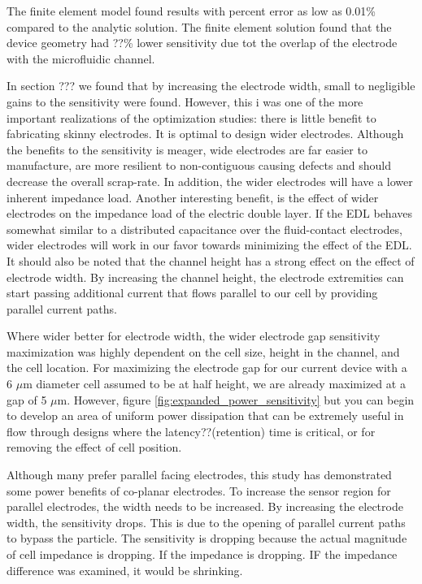\par The finite element model found results with percent error as low as 0.01\% compared to the analytic solution. The finite element solution found that the device geometry had ??\% lower sensitivity due tot the overlap of the electrode with the microfluidic channel.

\par In section ??? we found that by increasing the electrode width, small to negligible gains to the sensitivity were found. However, this i was one of the more important realizations of the optimization studies: there is little benefit to fabricating skinny electrodes. It is optimal to design wider electrodes. Although the benefits to the sensitivity is meager, wide electrodes are far easier to manufacture, are more resilient to non-contiguous causing defects and should decrease the overall scrap-rate. In addition, the wider electrodes will have a lower inherent impedance load. Another interesting benefit, is the effect of wider electrodes on the impedance load of the electric double layer. If the EDL behaves somewhat similar to a distributed capacitance over the fluid-contact electrodes, wider electrodes will work in our favor towards minimizing the effect of the EDL. It should also be noted that the channel height has a strong effect on the effect of electrode width. By increasing the channel height, the electrode extremities can start passing additional current that flows parallel to our cell by providing parallel current paths.

\par Where wider better for electrode width, the wider electrode gap sensitivity maximization was highly dependent on the cell size, height in the channel, and the cell location. For maximizing the electrode gap for our current device with a 6 $\mu$m diameter cell assumed to be at half height, we are already maximized at a gap of 5 $\mu$m. However, figure \ref{fig:expanded_power_sensitivity} but you can begin to develop an area of uniform power dissipation that can be extremely useful in flow through designs where the latency??(retention) time is critical, or for removing the effect of cell position. 

\par Although many prefer parallel facing electrodes, this study has demonstrated some power benefits of co-planar electrodes. To increase the sensor region for parallel electrodes, the width needs to be increased. By increasing the electrode width, the sensitivity drops. This is due to the opening of parallel current paths to bypass the particle. The sensitivity is dropping because the actual magnitude of cell impedance is dropping. If the impedance is dropping. IF the impedance difference was examined, it would be shrinking.

